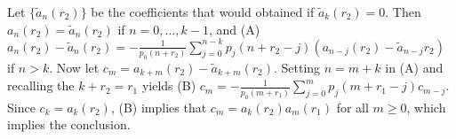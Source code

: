 \documentclass{ximera}
\begin{document}
\begin{problem}
\begin{enumerate}
\begin{solution}
    Let $\{\tilde a_n(r_2)\}$ be the coefficients that would
obtained if $\tilde a_k(r_2)=0$. Then $a_n(r_2)=\tilde a_n(r_2)$ if
$n=0,\dots,k-1$, and (A) $a_n(r_2)-\tilde a_n(r_2)=-\frac{1}{
p_0(n+r_2)}\sum_{j=0}^{n-k} p_j(n+r_2-j)(a_{n-j}(r_2)-\tilde
a_{n-j}{r_2})$ if $n>k$. Now let $c_m=a_{k+m}(r_2)-\tilde
a_{k+m}(r_2)$. Setting $n=m+k$ in (A) and recalling the $k+r_2=r_1$
yields (B) $c_m=-\frac{1}{ p_0(m+r_1)}\sum_{j=0}^m
p_j(m+r_1-j)c_{m-j}$. Since $c_k=a_k(r_2)$, (B) implies that
$c_m=a_k(r_2)a_m(r_1)$ for all $m\geq 0$, which implies the conclusion.
\end{solution}
\end{enumerate}
\end{problem}
\end{document}
